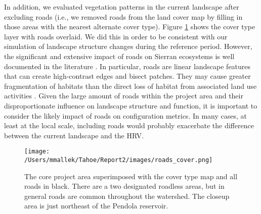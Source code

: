 

In addition, we evaluated vegetation patterns in the current landscape after excluding roads (i.e., we removed roads from the land cover map by filling in those areas with the nearest alternate cover type). Figure \ref{fig:roadcovermap} shows the cover type layer with roads overlaid. We did this in order to be consistent with our simulation of landscape structure changes during the reference period. However, the significant and extensive impact of roads on Sierran ecosystems is well documented in the literature \citep{Karr2004,Trombulak2000,Gucinski2001,Theobald2011}.  In particular, roads are linear landscape features that can create high-contrast edges and bisect patches. They may cause greater fragmentation of habitats than the direct loss of habitat from associated land use activities \citep{Gucinski2001,Tinker1998,Mcgarigal2001}. Given the large amount of roads within the project area and their disproportionate influence on landscape structure and function, it is important to consider the likely impact of roads on configuration metrics. In many cases, at least at the local scale, including roads would probably exacerbate the difference between the current landscape and the HRV.
%
\begin{figure}[!htbp]
  \centering
  \texttt{[image: /Users/mmallek/Tahoe/Report2/images/roads\_cover.png]}
  \caption{The core project area superimposed with the cover type map and all roads in black. There are a two designated roadless areas, but in general roads are common throughout the watershed. The closeup area is just northeast of the Pendola reservoir.} 
  \label{fig:roadcovermap}
\end{figure}
%


